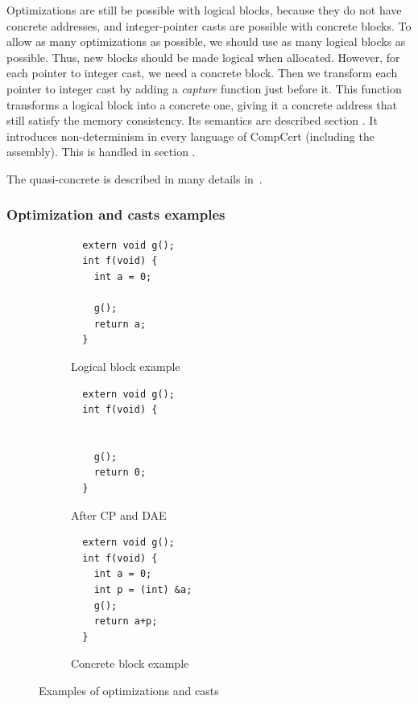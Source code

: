 Optimizations are still be possible with logical blocks, because they do not have concrete addresses, and integer-pointer casts are possible with concrete blocks.
To allow as many optimizations as possible, we should use as many logical blocks as possible. Thus, new blocks should be made logical when allocated.
However, for each pointer to integer cast, we need a concrete block. Then we transform each pointer to integer cast by adding a \textit{capture} function just before it. This function transforms a logical block into a concrete one, giving it a concrete address that still satisfy the memory consistency. Its semantics are described section .
It introduces non-determinism in every language of CompCert (including the assembly). This is handled in section .

The quasi-concrete is described in many details in~\cite{DBLP:conf/pldi/KangHMGZV15}.
\subsubsection{Optimization and casts examples}

\lstset{}
\begin{figure}
\begin{subfigure}{.33\textwidth}
  \begin{lstlisting}
  extern void g();
  int f(void) {
    int a = 0;
    
    g();
    return a;
  }
  \end{lstlisting}
  \caption{Logical block example}
  \label{fig:logical}
\end{subfigure}%
\begin{subfigure}{.33\textwidth}
  \begin{lstlisting}
  extern void g();
  int f(void) {

    
    g();
    return 0;
  }
  \end{lstlisting}
  \caption{After CP and DAE}
  \label{fig:cpdae}
\end{subfigure}
\begin{subfigure}{.33\textwidth}
  \begin{lstlisting}
  extern void g();
  int f(void) {
    int a = 0;
    int p = (int) &a;
    g();
    return a+p;
  }
  \end{lstlisting}
  \caption{Concrete block example}
  \label{fig:concrete}
\end{subfigure}
\caption{Examples of optimizations and casts}
\label{fig:examples}
\end{figure}

